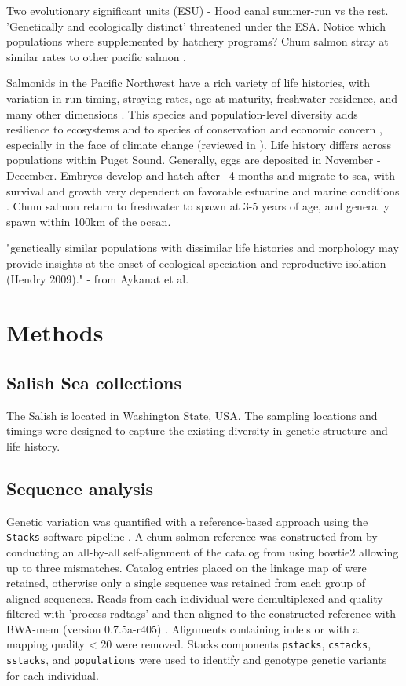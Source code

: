 \documentclass[12pt, one column]{article}
\begin{document}
Two evolutionary significant units (ESU) - Hood canal summer-run vs the rest. 'Genetically and ecologically distinct' threatened under the ESA. Notice which populations where supplemented by hatchery programs?
Chum salmon stray at similar rates to other pacific salmon \cite{Small2014}.

Salmonids in the Pacific Northwest have a rich variety of life histories, with variation in run-timing, straying rates, age at maturity, freshwater residence, and many other dimensions \citep{Quinn2005}. This species and population-level diversity adds resilience to ecosystems and to species of conservation and economic concern \citep{Schindler2010}, especially in the face of climate change (reviewed in \citet{Schindler2015}).  Life history differs across populations within Puget Sound.  Generally, eggs are deposited in November - December. Embryos develop and hatch after ~4 months and migrate to sea, with survival and growth very dependent on favorable estuarine and marine conditions  \citep{Quinn2005}.  Chum salmon return to freshwater to spawn at 3-5 years of age, and generally spawn within 100km of the ocean.


"genetically similar populations with dissimilar life histories and morphology may provide insights at the onset of ecological speciation and reproductive isolation (Hendry 2009)." - from Aykanat et al.


\section*{Methods}

\subsection*{Salish Sea collections}
The Salish is located in Washington State, USA. The sampling locations and timings were designed to capture the existing diversity in genetic structure and life history.

\subsection*{Sequence analysis}
Genetic variation was quantified with a reference-based approach using the \texttt{Stacks} software pipeline \citep{Catchen2013}.  A chum salmon reference was constructed from by conducting an all-by-all self-alignment of the catalog from \citep{Waples2015} using bowtie2 \citep{Langmead2012} allowing up to three mismatches.  Catalog entries placed on the linkage map of \citet{Waples2015} were retained, otherwise only a single sequence was retained from each group of aligned sequences.  Reads from each individual were demultiplexed and quality filtered with 'process-radtags' and then aligned to the constructed reference with BWA-mem (version 0.7.5a-r405) \citep{Li2013}.  Alignments containing indels or with a mapping quality < 20 were removed. Stacks components \texttt{pstacks}, \texttt{cstacks}, \texttt{sstacks}, and \texttt{populations} were used to identify and genotype genetic variants for each individual.
\end{document}
